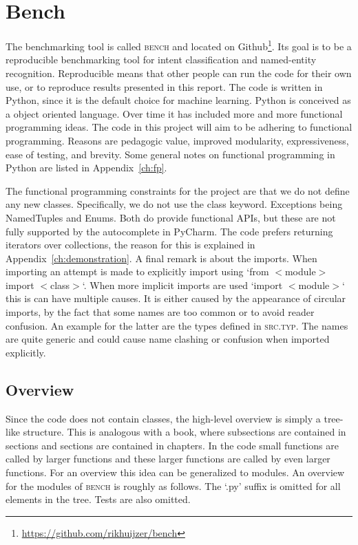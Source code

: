 \section{Bench}
\label{sec:bench}
The benchmarking tool is called \textsc{bench} and located on Github\footnote{\url{https://github.com/rikhuijzer/bench}}.
Its goal is to be a reproducible benchmarking tool for intent classification and named-entity recognition.
Reproducible means that other people can run the code for their own use, or to reproduce results presented in this report.
The code is written in Python, since it is the default choice for machine learning.
Python is conceived as a object oriented language.
Over time it has included more and more functional programming ideas.
The code in this project will aim to be adhering to functional programming.
Reasons are pedagogic value, improved modularity, expressiveness, ease of testing, and brevity.
Some general notes on functional programming in Python are listed in Appendix~\ref{ch:fp}.

The functional programming constraints for the project are that we do not define any new classes.
Specifically, we do not use the class keyword.
Exceptions being NamedTuples and Enums.
Both do provide functional APIs, but these are not fully supported by the autocomplete in PyCharm.
The code prefers returning iterators over collections, the reason for this is explained in Appendix~\ref{ch:demonstration}.
A final remark is about the imports.
When importing an attempt is made to explicitly import using `from $<$module$>$ import $<$class$>$`.
When more implicit imports are used `import $<$module$>$` this is can have multiple causes.
It is either caused by the appearance of circular imports, by the fact that some names are too common or to avoid reader confusion.
An example for the latter are the types defined in \textsc{src.typ}.
The names are quite generic and could cause name clashing or confusion when imported explicitly.

\subsection{Overview}
\label{subsec:overview}
Since the code does not contain classes, the high-level overview is simply a tree-like structure.
This is analogous with a book, where subsections are contained in sections and sections are contained in chapters.
In the code small functions are called by larger functions and these larger functions are called by even larger functions.
For an overview this idea can be generalized to modules.
An overview for the modules of \textsc{bench} is roughly as follows.
The `.py' suffix is omitted for all elements in the tree.
Tests are also omitted.

